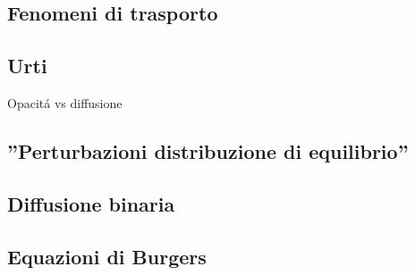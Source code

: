 \documentclass[../main.tex]{subfiles}
\begin{document}
\begin{refsection}

\nocite{*}


\begingroup
\let\clearpage\relax



\endgroup

\section{Fenomeni di trasporto}


\subsection{Urti}

Opacit\'a vs diffusione

\subsection{''Perturbazioni distribuzione di equilibrio''}

\subsection{Diffusione binaria}


\subsection{Equazioni di Burgers}


\end{refsection}
\end{document}
